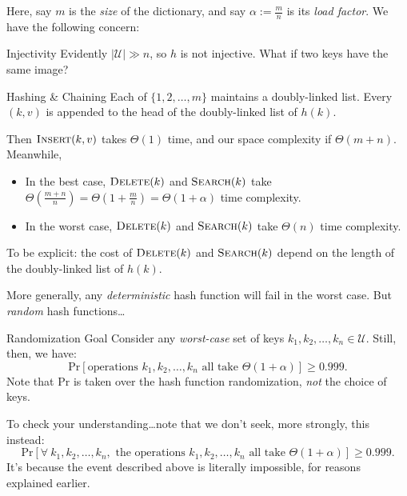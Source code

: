 Here, say $m$ is the \emph{size} of the dictionary, and say $\alpha := \frac{m}{n}$ is its \emph{load factor}.  We have the following concern:

\begin{problem}{Injectivity}
    Evidently $|\mathcal{U}| \gg n$, so $h$ is not injective.  What if two keys have the same image?
\end{problem}

\begin{solution}{Hashing \& Chaining}
    Each of $\{1, 2, \dots, m\}$ maintains a doubly-linked list.  Every $(k, v)$ is appended to the head of the doubly-linked list of $h(k)$.

    Then $\textsc{Insert}(k, v)$ takes $\Theta(1)$ time, and our space complexity if $\Theta(m + n)$.  Meanwhile,
    \begin{itemize}
        \item In the best case, $\textsc{Delete}(k)$ and $\textsc{Search}(k)$ take $\Theta\left(\frac{m + n}{n}\right) = \Theta\left(1 + \frac{m}{n}\right) = \Theta(1 + \alpha)$ time complexity.
        \item In the worst case, $\textsc{Delete}(k)$ and $\textsc{Search}(k)$ take $\Theta(n)$ time complexity.
    \end{itemize}
    To be explicit: the cost of $\textsc{Delete}(k)$ and $\textsc{Search}(k)$ depend on the length of the doubly-linked list of $h(k)$.
\end{solution}

More generally, any \emph{deterministic} hash function will fail in the worst case.  But \emph{random} hash functions\dots

\begin{problem}{Randomization Goal}
Consider any \emph{worst-case} set of keys $k_1, k_2, \dots, k_n \in \mathcal{U}$.  Still, then, we have:
\[ \mathrm{Pr}\left [\text{operations } k_1, k_2, \dots, k_n \text{ all take } \Theta\left(1 + \alpha \right) \right ] \geq 0.999. \]
Note that $\mathrm{Pr}$ is taken over the hash function randomization, \emph{not} the choice of keys.
\end{problem}

To check your understanding\dots note that we don't seek, more strongly, this instead:
\[ \mathrm{Pr}\left [ \forall \ k_1, k_2, \dots, k_n, \text{ the operations } k_1, k_2, \dots, k_n \text{ all take } \Theta\left(1 + \alpha\right) \right ] \geq 0.999. \]
It's because the event described above is literally impossible, for reasons explained earlier.

